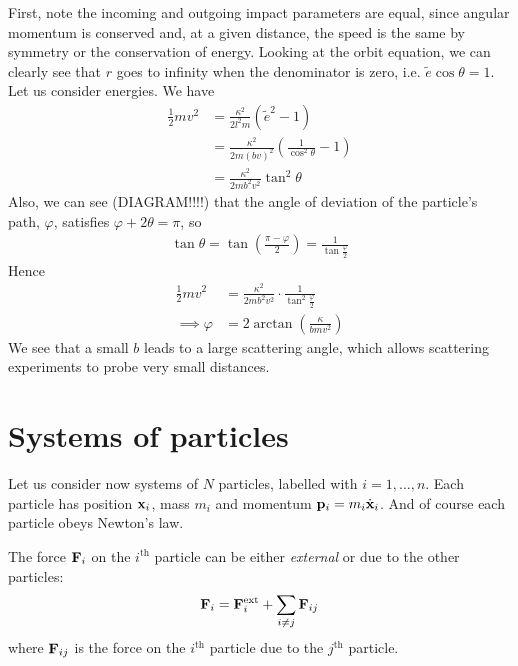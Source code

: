 \documentclass{../../template/note}
\begin{document}
    First, note the incoming and outgoing impact parameters are equal, since angular momentum is conserved and, at a given distance, the speed is the same by symmetry or the conservation of energy. Looking at the orbit equation, we can clearly see that \(r\) goes to infinity when the denominator is zero, i.e. \(\tilde e \cos \theta = 1\). Let us consider energies. We have
    \begin{align*}
        \frac 1 2 mv^2 &= \frac{\kappa^2}{2l^2m} \left(\tilde e^2 - 1\right) \\
        &= \frac{\kappa^2}{2m(bv)^2} \left(\frac{1}{\cos^2 \theta}-1\right) \\
        &= \frac{\kappa^2}{2mb^2v^2} \tan^2 \theta
    \end{align*}
    Also, we can see (DIAGRAM!!!!) that the angle of deviation of the particle's path, \(\varphi\), satisfies \(\varphi + 2\theta = \pi\), so
    \begin{align*}
        \tan \theta = \tan \left(\frac{\pi-\varphi}2\right) = \frac 1 {\tan \frac{\varphi}2}
    \end{align*}
    Hence
    \begin{align*}
        \frac 1 2 mv^2 &= \frac{\kappa^2}{2mb^2v^2} \cdot \frac 1 {\tan^2 \frac{\varphi}2} \\
        \implies \varphi &= 2 \arctan \left(\frac \kappa{bmv^2}\right)
    \end{align*}
    We see that a small \(b\) leads to a large scattering angle, which allows scattering experiments to probe very small distances.

    \section{Systems of particles}
    
    Let us consider now systems of \(N\) particles, labelled with \(i = 1, \dots, n\). Each particle has position \(\V x_i\), mass \(m_i\) and momentum \(\V p_i = m_i \dot{\V x}_i\). And of course each particle obeys Newton's law.
    
    The force \(\V F_i\) on the \(i^\text{th}\) particle can be either \emph{external} or due to the other particles:
    \begin{align*}
        \V F_i = \V F_i^\text{ext} + \sum_{i \neq j} \V F_{ij}
    \end{align*}
    where \(\V F_{ij}\) is the force on the \(i^\text{th}\) particle due to the \(j^\text{th}\) particle.
    
\end{document}
